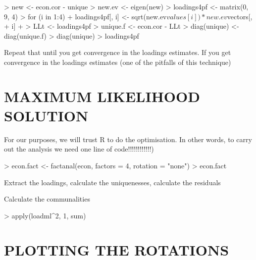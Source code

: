 \begin{Schunk}
\begin{Sinput}
> new <- econ.cor - unique
> new.ev <- eigen(new)
> loadings4pf <- matrix(0, 9, 4)
> for (i in 1:4) {
+     loadings4pf[, i] <- sqrt(new.ev$values[i]) * new.ev$vectors[, 
+         i]
+ }
> LLt <- loadings4pf %*% t(loadings4pf)
> unique.f <- econ.cor - LLt
> diag(unique) <- diag(unique.f)
> diag(unique)
> loadings4pf
\end{Sinput}
\end{Schunk}

Repeat that until you get convergence in the loadings estimates.   If
you get convergence in the loadings estimates (one of the pitfalls of
this technique)


\section{MAXIMUM LIKELIHOOD SOLUTION}

For our purposes, we will trust R to do the optimisation.  In other
words, to carry out the analysis we need one line of code!!!!!!!!!!!!)

\begin{Schunk}
\begin{Sinput}
> econ.fact <- factanal(econ, factors = 4, rotation = "none")
> econ.fact
\end{Sinput}
\end{Schunk}

Extract the loadings, calculate the uniquenesses, calculate the residuals

\begin{Schunk}
\end{Schunk}

Calculate the communalities

\begin{Schunk}
\begin{Sinput}
> apply(loadml^2, 1, sum)
\end{Sinput}
\end{Schunk}

\section{PLOTTING THE ROTATIONS}

